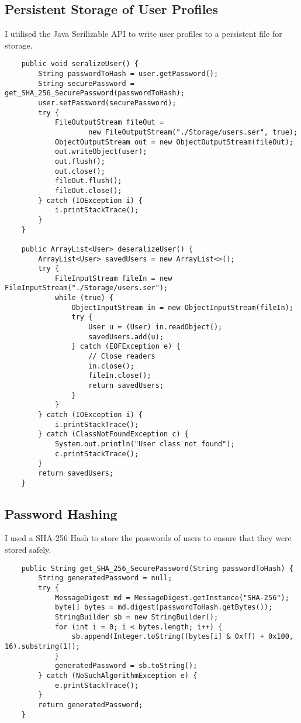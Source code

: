 \documentclass{article}
\begin{document}
\subsection{Persistent Storage of User Profiles}
I utilised the Java Serilizable API to write user profiles to a persistent file for storage. 
\begin{lstlisting}
    public void seralizeUser() {
        String passwordToHash = user.getPassword();
        String securePassword = get_SHA_256_SecurePassword(passwordToHash);
        user.setPassword(securePassword);
        try {
            FileOutputStream fileOut =
                    new FileOutputStream("./Storage/users.ser", true);
            ObjectOutputStream out = new ObjectOutputStream(fileOut);
            out.writeObject(user);
            out.flush();
            out.close();
            fileOut.flush();
            fileOut.close();
        } catch (IOException i) {
            i.printStackTrace();
        }
    }

    public ArrayList<User> deseralizeUser() {
        ArrayList<User> savedUsers = new ArrayList<>();
        try {
            FileInputStream fileIn = new FileInputStream("./Storage/users.ser");
            while (true) {
                ObjectInputStream in = new ObjectInputStream(fileIn);
                try {
                    User u = (User) in.readObject();
                    savedUsers.add(u);
                } catch (EOFException e) {
                    // Close readers
                    in.close();
                    fileIn.close();
                    return savedUsers;
                }
            }
        } catch (IOException i) {
            i.printStackTrace();
        } catch (ClassNotFoundException c) {
            System.out.println("User class not found");
            c.printStackTrace();
        }
        return savedUsers;
    }
\end{lstlisting}

\subsection{Password Hashing}
I used a SHA-256 Hash to store the passwords of users to ensure that they were stored safely. 

\begin{lstlisting}
    public String get_SHA_256_SecurePassword(String passwordToHash) {
        String generatedPassword = null;
        try {
            MessageDigest md = MessageDigest.getInstance("SHA-256");
            byte[] bytes = md.digest(passwordToHash.getBytes());
            StringBuilder sb = new StringBuilder();
            for (int i = 0; i < bytes.length; i++) {
                sb.append(Integer.toString((bytes[i] & 0xff) + 0x100, 16).substring(1));
            }
            generatedPassword = sb.toString();
        } catch (NoSuchAlgorithmException e) {
            e.printStackTrace();
        }
        return generatedPassword;
    }
\end{lstlisting}

\medskip
\printbibliography
\end{document}
